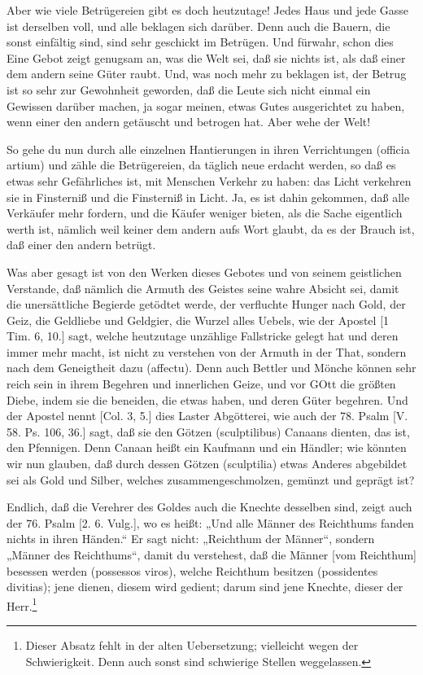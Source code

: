Aber wie viele Betrügereien gibt es doch heutzutage! Jedes Haus und jede Gasse ist derselben voll, und alle beklagen sich darüber. Denn auch die Bauern, die sonst einfältig sind, sind sehr geschickt im Betrügen. Und fürwahr, schon dies Eine Gebot zeigt genugsam an, was die Welt sei, daß sie nichts ist, als daß einer dem andern seine Güter raubt. Und, was noch mehr zu beklagen ist, der Betrug ist so sehr zur Gewohnheit geworden, daß die Leute sich nicht einmal ein Gewissen darüber machen, ja sogar meinen, etwas Gutes ausgerichtet zu haben, wenn einer den andern getäuscht und betrogen hat. Aber wehe der Welt!

So gehe du nun durch alle einzelnen Hantierungen in ihren Verrichtungen (officia artium) und zähle die Betrügereien, da täglich neue erdacht werden, so daß es etwas sehr Gefährliches ist, mit Menschen Verkehr zu haben: das Licht verkehren sie in Finsterniß und die Finsterniß in Licht. Ja, es ist dahin gekommen, daß alle Verkäufer mehr fordern, und die Käufer weniger bieten, als die Sache eigentlich werth ist, nämlich weil keiner dem andern aufs Wort glaubt, da es der Brauch ist, daß einer den andern betrügt.

Was aber gesagt ist von den Werken dieses Gebotes und von seinem geistlichen Verstande, daß nämlich die Armuth des Geistes seine wahre Absicht sei, damit die unersättliche Begierde getödtet werde, der verfluchte Hunger nach Gold, der Geiz, die Geldliebe und Geldgier, die Wurzel alles Uebels, wie der Apostel [1 Tim. 6, 10.] sagt, welche heutzutage unzählige Fallstricke gelegt hat und deren immer mehr macht, ist nicht zu verstehen von der Armuth in der That, sondern nach dem Geneigtheit dazu (affectu). Denn auch Bettler und Mönche können sehr reich sein in ihrem Begehren und innerlichen Geize, und vor GOtt die größten Diebe, indem sie die beneiden, die etwas haben, und deren Güter begehren. Und der Apostel nennt [Col. 3, 5.] dies Laster Abgötterei, wie auch der 78. Psalm [V. 58. Ps. 106, 36.] sagt, daß sie den Götzen
(sculptilibus) Canaans dienten, das ist, den Pfennigen. Denn Canaan heißt ein Kaufmann und ein Händler; wie könnten wir nun glauben, daß durch dessen Götzen (sculptilia) etwas Anderes abgebildet sei als Gold und Silber, welches zusammengeschmolzen, gemünzt und geprägt ist?

Endlich, daß die Verehrer des Goldes auch die Knechte desselben sind, zeigt auch der 76. Psalm [2. 6. Vulg.], wo es heißt: „Und alle Männer des Reichthums fanden nichts in ihren Händen.“ Er sagt nicht: „Reichthum der Männer“, sondern „Männer des Reichthums“, damit du verstehest, daß die Männer [vom Reichthum] besessen werden (possessos viros), welche Reichthum besitzen (possidentes divitias); jene dienen, diesem wird gedient; darum sind jene Knechte, dieser der Herr.\footnote{Dieser Absatz fehlt in der alten Uebersetzung; vielleicht wegen der Schwierigkeit. Denn auch sonst sind schwierige Stellen weggelassen.}

